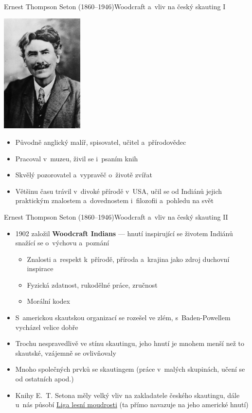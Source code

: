 \documentclass[compress, ucs, xelatex, xcolor=dvipsnames, print,
  hyperref={
    bookmarks=true,
    unicode=true,
    colorlinks=true,
    plainpages=false,
    pdfkeywords={Skaut, Junak, Skauting, Vychovna metoda},
    linkcolor=Black,
    anchorcolor=Black,
    citecolor=OliveGreen,
    filecolor=OliveGreen,
    menucolor=Black,
    urlcolor=OliveGreen,
    pdftex}
  ]{beamer}
\begin{document}
\begin{frame}{Ernest Thompson Seton (1860--1946)}{Woodcraft a~vliv na český skauting I}
  \begin{multicols}{2}
    \begin{center}
      \includegraphics[height=6cm]{seton.jpg}
    \end{center}
    \columnbreak
    \begin{itemize}
      \item Původně anglický malíř, spisovatel, učitel a~přírodovědec
      \item Pracoval v~muzeu, živil se i~psaním knih
      \item Skvělý pozorovatel a~vypravěč o~životě zvířat
      \item Většinu času trávil v~divoké přírodě v~USA, učil se od Indiánů jejich praktickým znalostem a~dovednostem i~filozofii a~pohledu na svět
    \end{itemize}
  \end{multicols}
\end{frame}

\begin{frame}{Ernest Thompson Seton (1860--1946)}{Woodcraft a~vliv na český skauting II}
  \begin{itemize}
    \item 1902 založil \textbf{Woodcraft Indians} --- hnutí inspirující se životem Indiánů snažící se o~výchovu a~poznání
    \begin{itemize}
      \item Znalosti a~respekt k~přírodě, příroda a~krajina jako zdroj duchovní inspirace
      \item Fyzická zdatnost, rukodělné práce, zručnost
      \item Morální kodex
    \end{itemize}
    \item S~americkou skautskou organizací se rozešel ve zlém, s~Baden-Powellem vycházel velice dobře
    \item Trochu nespravedlivě ve stínu skautingu, jeho hnutí je mnohem menší než to skautské, vzájemně se ovlivňovaly
    \item Mnoho společných prvků se skautingem (práce v~malých skupinách, učení se od ostatních apod.)
    \item Knihy E.~T. Setona měly velký vliv na zakladatele českého skautingu, dále u~nás působí \href{http://www.woodcraft.cz/}{Liga lesní moudrosti} (ta přímo navazuje na jeho americké hnutí)
  \end{itemize}
\end{frame}
\end{document}
